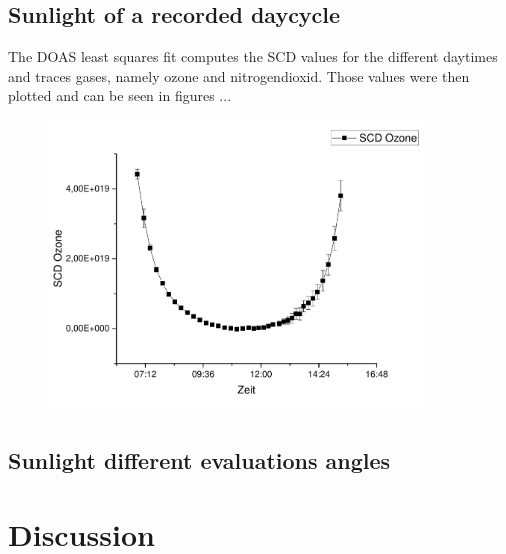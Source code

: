 \documentclass[12pt, english]{scrartcl} %
\begin{document}
\begin{multicols}{2}
\subsection{Sunlight of a recorded daycycle}
The DOAS least squares fit computes the SCD values for the different daytimes and traces gases, namely ozone and nitrogendioxid. Those values were then plotted and can be seen in figures ...
\begin{figure}
\includegraphics[width= 0.9\textwidth]{graphics/o3scd.pdf}
\end{figure}

\subsection{Sunlight different evaluations angles}


\section{Discussion}
\end{multicols}
\end{document}
